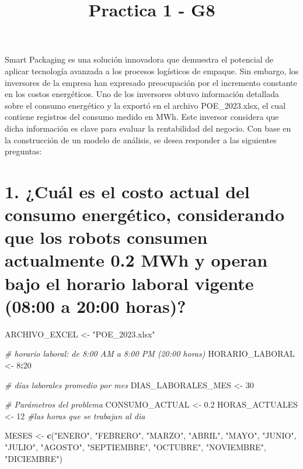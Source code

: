 \documentclass[
]{article}
\title{Practica 1 - G8}
\author{}
\date{\vspace{-2.5em}}
\newenvironment{Shaded}{\begin{snugshade}}{\end{snugshade}}
\newcommand{\CommentTok}[1]{\textcolor[rgb]{0.56,0.35,0.01}{\textit{#1}}}
\newcommand{\DecValTok}[1]{\textcolor[rgb]{0.00,0.00,0.81}{#1}}
\newcommand{\FloatTok}[1]{\textcolor[rgb]{0.00,0.00,0.81}{#1}}
\newcommand{\FunctionTok}[1]{\textcolor[rgb]{0.13,0.29,0.53}{\textbf{#1}}}
\newcommand{\NormalTok}[1]{#1}
\newcommand{\OtherTok}[1]{\textcolor[rgb]{0.56,0.35,0.01}{#1}}
\newcommand{\SpecialCharTok}[1]{\textcolor[rgb]{0.81,0.36,0.00}{\textbf{#1}}}
\newcommand{\StringTok}[1]{\textcolor[rgb]{0.31,0.60,0.02}{#1}}
\begin{document}
\maketitle

Smart Packaging es una solución innovadora que demuestra el potencial de
aplicar tecnología avanzada a los procesos logísticos de empaque. Sin
embargo, los inversores de la empresa han expresado preocupación por el
incremento constante en los costos energéticos. Uno de los inversores
obtuvo información detallada sobre el consumo energético y la exportó en
el archivo POE\_2023.xlsx, el cual contiene registros del consumo medido
en MWh. Este inversor considera que dicha información es clave para
evaluar la rentabilidad del negocio. Con base en la construcción de un
modelo de análisis, se desea responder a las siguientes preguntas:

\section{1. ¿Cuál es el costo actual del consumo energético,
considerando que los robots consumen actualmente 0.2 MWh y operan bajo
el horario laboral vigente (08:00 a 20:00
horas)?}\label{cuuxe1l-es-el-costo-actual-del-consumo-energuxe9tico-considerando-que-los-robots-consumen-actualmente-0.2-mwh-y-operan-bajo-el-horario-laboral-vigente-0800-a-2000-horas}

\begin{Shaded}
\begin{Highlighting}[]
\NormalTok{ARCHIVO\_EXCEL }\OtherTok{\textless{}{-}} \StringTok{"POE\_2023.xlsx"}

\CommentTok{\# horario laboral: de 8:00 AM a 8:00 PM (20:00 horas)}
\NormalTok{HORARIO\_LABORAL }\OtherTok{\textless{}{-}} \DecValTok{8}\SpecialCharTok{:}\DecValTok{20} 

\CommentTok{\# días laborales promedio por mes}
\NormalTok{DIAS\_LABORALES\_MES }\OtherTok{\textless{}{-}} \DecValTok{30}

\CommentTok{\# Parámetros del problema}
\NormalTok{CONSUMO\_ACTUAL }\OtherTok{\textless{}{-}} \FloatTok{0.2}
\NormalTok{HORAS\_ACTUALES }\OtherTok{\textless{}{-}} \DecValTok{12} \CommentTok{\#las horas que se trabajan al dia}

\NormalTok{MESES }\OtherTok{\textless{}{-}} \FunctionTok{c}\NormalTok{(}\StringTok{"ENERO"}\NormalTok{, }\StringTok{"FEBRERO"}\NormalTok{, }\StringTok{"MARZO"}\NormalTok{, }\StringTok{"ABRIL"}\NormalTok{, }\StringTok{"MAYO"}\NormalTok{, }\StringTok{"JUNIO"}\NormalTok{,}
           \StringTok{"JULIO"}\NormalTok{, }\StringTok{"AGOSTO"}\NormalTok{, }\StringTok{"SEPTIEMBRE"}\NormalTok{, }\StringTok{"OCTUBRE"}\NormalTok{, }\StringTok{"NOVIEMBRE"}\NormalTok{, }\StringTok{"DICIEMBRE"}\NormalTok{)}
\end{Highlighting}
\end{Shaded}
\end{document}
